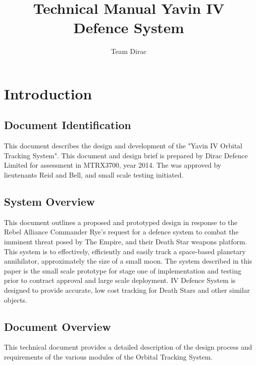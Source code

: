 \documentclass[]{report}
\title{Technical Manual \newline Yavin IV Defence System}
\author{Team Dirac}
\begin{document}
\maketitle

\chapter{Introduction}
\section{Document Identification}
This document describes the design and development of the "Yavin IV Orbital Tracking System".  This document and design brief is prepared by Dirac Defence Limited for assessment in MTRX3700, year 2014. The was approved by lieutenants Reid and Bell, and small scale testing initiated. 

\section{System Overview}

This document outlines a proposed and prototyped design in response to the Rebel Alliance Commander Rye's request for a defence system to combat the imminent threat posed by The Empire, and their Death Star weapons platform. This system is to effectively, efficiently and easily track a space-based planetary annihilator, approximately the size of a small moon.\newline
The system described in this paper is the small scale prototype for stage one of implementation and testing prior to contract approval and large scale deployment. IV Defence System is designed to provide accurate, low cost tracking for Death Stars and other similar objects.

\section{Document Overview}

This technical document provides a detailed description of the design process and requirements of the various modules of the Orbital Tracking System. \newline
\end{document}
